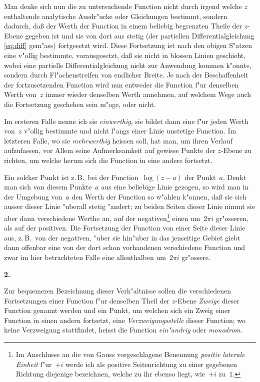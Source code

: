 \documentclass[12pt,a4paper]{book}
\theoremstyle{definition}
\theoremstyle{remark}
\begin{document}
Man denke sich nun die zu untersuchende Function nicht durch irgend
welche $z$ enthaltende analytische Ausdr"ucke oder Gleichungen bestimmt,
sondern dadurch, da\ss{} der Werth der Function in einem beliebig begrenzten
Theile der $z$-Ebene gegeben ist und sie von dort aus stetig (der partiellen
Differentialgleichung \eqref{eq:diff} gem"ass) fortgesetzt wird. Diese
Fortsetzung ist nach den obigen S"atzen eine v"ollig bestimmte,
vorausgesetzt, da\ss{} sie nicht in blossen Linien geschieht, wobei eine
partielle Differentialgleichung nicht zur Anwendung kommen k"onnte,
sondern durch Fl"achenstreifen von endlicher Breite. Je nach der
Beschaffenheit der fortzusetzenden Function wird nun entweder die
Function f"ur denselben Werth von~$z$ immer wieder denselben Werth
annehmen, auf welchem Wege auch die Fortsetzung geschehen sein m"oge,
oder nicht.

Im ersteren Falle nenne ich sie \emph{einwerthig}, sie bildet dann eine
f"ur jeden Werth von~$z$ v"ollig bestimmte und nicht l"angs einer Linie
unstetige Function. Im letzteren Falle, wo sie \emph{mehrwerthig} heissen
soll, hat man, um ihren Verlauf aufzufassen, vor Allem seine Aufmerksamkeit
auf gewisse Punkte der $z$-Ebene zu richten, um welche herum sich die
Function in eine andere fortsetzt.

Ein solcher Punkt ist z.\,B.\ bei der Function~$\log(z-a)$ der Punkt~$a$.
Denkt man sich von diesem Punkte~$a$ aus eine beliebige Linie gezogen,
so wird man in der Umgebung von~$a$ den Werth der Function so w"ahlen
k"onnen, da\ss{} sie sich ausser dieser Linie "uberall stetig "andert; zu beiden
Seiten dieser Linie nimmt sie aber dann verschiedene Werthe an, auf der
negativen\footnote{Im Anschlusse an die von Gauss vorgeschlagene Benennung
\emph{positiv laterale Einheit} f"ur~$+i$ werde ich als positive
Seitenrichtung zu einer gegebenen Richtung diejenige bezeichnen, welche
zu ihr ebenso liegt, wie~$+i$ zu~$1$.} einen um~$2\pi i$ gr"osseren, als auf der
positiven. Die Fortsetzung der Function von einer Seite dieser Linie aus,
z.\,B.\ von der negativen, "uber sie hin"uber in das jenseitige Gebiet
giebt dann offenbar eine von der dort schon vorhandenen verschiedene
Function und zwar im hier betrachteten Falle eine allenthalben um~$2\pi i$
gr"ossere.

\medskip
\textbf{2.}

Zur bequemeren Bezeichnung dieser Verh"altnisse sollen die verschiedenen
Fortsetzungen einer Function f"ur denselben Theil der $z$-Ebene
\emph{Zweige} dieser Function genannt werden und ein Punkt, um welchen
sich ein Zweig einer Function in einen andern fortsetzt, eine
\emph{Verzweigungsstelle} dieser Function; wo keine Verzweigung stattfindet,
heisst die Function \emph{ein"andrig} oder \emph{monodrom}.
\end{document}
